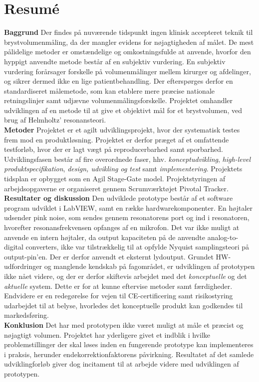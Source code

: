 \section*{Resumé}

\textbf{Baggrund} Der findes på nuværende tidspunkt ingen klinisk accepteret teknik til brystvolumenmåling, da der mangler evidens for nøjagtigheden af målet. De mest pålidelige metoder er omstændelige og omkostningsfulde at anvende, hvorfor den hyppigt anvendte metode består af en subjektiv vurdering. En subjektiv vurdering forårsager forskelle på volumenmålinger mellem kirurger og afdelinger, og sikrer dermed ikke en lige patientbehandling. Der efterspørges derfor en standardiseret målemetode, som kan etablere mere præcise nationale retningslinjer samt udjævne volumenmålingsforskelle. Projektet omhandler udviklingen af en metode til at give et objektivt mål for et brystvolumen, ved brug af Helmholtz' resonansteori. \\
\textbf{Metoder} Projektet er et agilt udviklingsprojekt, hvor der systematisk testes frem mod en produktløsning. Projektet er derfor præget af et omfattende testforløb, hvor der er lagt vægt på reproducerbarhed samt sporbarhed. 
Udviklingsfasen består af fire overordnede faser, hhv. \textit{konceptudvikling}, \textit{high-level produktspecifikation}, \textit{design, udvikling og test} samt \textit{implementering}.
Projektets tidsplan er opbygget som en Agil Stage-Gate model. Projektstyringen af arbejdsopgaverne er organiseret gennem Scrumværktøjet Pivotal Tracker.\\
\textbf{Resultater og diskussion} Den udviklede prototype består af et software program udviklet i LabVIEW, samt en række hardwarekomponenter. En højtaler udsender pink noise, som sendes gennem resonatorens port og ind i resonatoren, hvorefter resonansfrekvensen opfanges af en mikrofon. Det var ikke muligt at anvende en intern højtaler, da output kapaciteten på de anvendte analog-to-digital converters, ikke var tilstrækkelig til at opfylde Nyquist samplingsteori på output-pin'en. Der er derfor anvendt et eksternt lydoutput. Grundet HW-udfordringer og manglende kendskab på fagområdet, er udviklingen af prototypen ikke nået videre, og der er derfor skiftevis arbejdet med det \textit{konceptuelle} og det \textit{aktuelle} system. Dette er for at kunne eftervise metoder samt færdigheder. 
Endvidere er en redegørelse for vejen til CE-certificering samt risikostyring udarbejdet til at belyse, hvorledes det konceptuelle produkt kan godkendes til markedsføring.\\
\textbf{Konklusion} Det har med prototypen ikke været muligt at måle et præcist og nøjagtigt volumen. Projektet har yderligere givet et indblik i hvilke problemstillinger der skal løses inden en fungerende prototype kan implementeres i praksis, herunder endekorrektionfaktorens påvirkning. Resultatet af det samlede udviklingforløb giver dog incitament til at arbejde videre med udviklingen af prototypen.   